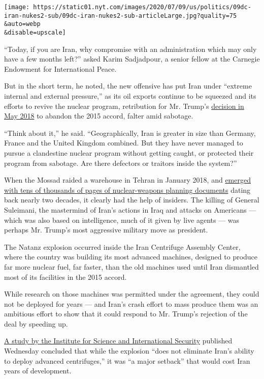 \texttt{[image: https://static01.nyt.com/images/2020/07/09/us/politics/09dc-iran-nukes2-sub/09dc-iran-nukes2-sub-articleLarge.jpg?quality=75\\\&auto=webp\\\&disable=upscale]}

``Today, if you are Iran, why compromise with an administration which
may only have a few months left?'' asked Karim Sadjadpour, a senior
fellow at the Carnegie Endowment for International Peace.

But in the short term, he noted, the new offensive has put Iran under
``extreme internal and external pressure,'' as its oil exports continue
to be squeezed and its efforts to revive the nuclear program,
retribution for Mr. Trump's
\href{https://www.nytimes.com/2018/05/08/world/middleeast/trump-iran-nuclear-deal.html}{decision
in May 2018} to abandon the 2015 accord, falter amid sabotage.

``Think about it,'' he said. ``Geographically, Iran is greater in size
than Germany, France and the United Kingdom combined. But they have
never managed to pursue a clandestine nuclear program without getting
caught, or protected their program from sabotage. Are there defectors or
traitors inside the system?''

When the Mossad raided a warehouse in Tehran in January 2018, and
\href{https://www.nytimes.com/2018/07/15/us/politics/iran-israel-mossad-nuclear.html}{emerged
with tens of thousands of pages of nuclear-weapons planning documents}
dating back nearly two decades, it clearly had the help of insiders. The
killing of General Suleimani, the mastermind of Iran's actions in Iraq
and attacks on Americans --- which was also based on intelligence, much
of it given by live agents --- was perhaps Mr. Trump's most aggressive
military move as president.

The Natanz explosion occurred inside the Iran Centrifuge Assembly
Center, where the country was building its most advanced machines,
designed to produce far more nuclear fuel, far faster, than the old
machines used until Iran dismantled most of its facilities in the 2015
accord.

While research on those machines was permitted under the agreement, they
could not be deployed for years --- and Iran's crash effort to mass
produce them was an ambitious effort to show that it could respond to
Mr. Trump's rejection of the deal by speeding up.

\href{https://isis-online.org/isis-reports/detail/damage-to-the-iran-centrifuge-assembly-center-icac-at-natanz/}{A
study by the Institute for Science and International Security} published
Wednesday concluded that while the explosion ``does not eliminate Iran's
ability to deploy advanced centrifuges,'' it was ``a major setback''
that would cost Iran years of development.

